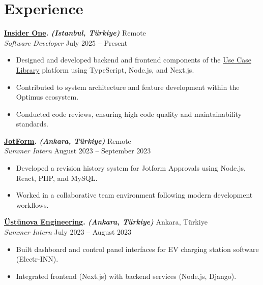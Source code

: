 \documentclass[10pt,a4paper]{extarticle}
\begin{document}
\section{Experience}
\textbf{\href{https://insiderone.com}{Insider One}. \textit{(Istanbul, Türkiye)}} \hfill Remote\\
\textit{Software Developer} \hfill July 2025 -- Present
\begin{itemize}[leftmargin=*,noitemsep,topsep=0pt]
    \item Designed and developed backend and frontend components of the \href{https://usecaselibrary.useinsider.com}{Use Case Library} platform using TypeScript, Node.js, and Next.js.
    \item Contributed to system architecture and feature development within the Optimus ecosystem.
    \item Conducted code reviews, ensuring high code quality and maintainability standards.
\end{itemize}
\textbf{\href{https://jotform.com}{JotForm}. \textit{(Ankara, Türkiye)}} \hfill Remote\\
\textit{Summer Intern} \hfill August 2023 -- September 2023
\begin{itemize}[leftmargin=*,noitemsep,topsep=0pt]
    \item Developed a revision history system for Jotform Approvals using Node.js, React, PHP, and MySQL.
    \item Worked in a collaborative team environment following modern development workflows.
\end{itemize}
\textbf{\href{https://www.ustunova.com.tr}{Üstünova Engineering}. \textit{(Ankara, Türkiye)}} \hfill Ankara, Türkiye\\
\textit{Summer Intern} \hfill July 2023 -- August 2023
\begin{itemize}[leftmargin=*,noitemsep,topsep=0pt]
    \item Built dashboard and control panel interfaces for EV charging station software (Electr-INN).
    \item Integrated frontend (Next.js) with backend services (Node.js, Django).
\end{itemize}
\end{document}
